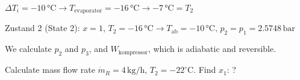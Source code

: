 \( \Delta T_i = -10 \, \text{°C} \rightarrow T_{\text{evaporator}} = -16 \, \text{°C} \rightarrow -7 \, \text{°C} = T_2 \)  

Zustand 2 (State 2): \( x = 1 \), \( T_2 = -16 \, \text{°C} \rightarrow T_{\text{ab}} = -10 \, \text{°C}, \, p_2 = p_1 = 2.5748 \, \text{bar} \)  

We calculate \( p_2 \) and \( p_3 \), and \( W_{\text{kompressor}} \), which is adiabatic and reversible.

Calculate mass flow rate \( \dot{m}_{R} = 4 \, \text{kg/h} \), \( T_2 = -22^\circ \text{C} \).  
Find \( x_1 \): ?